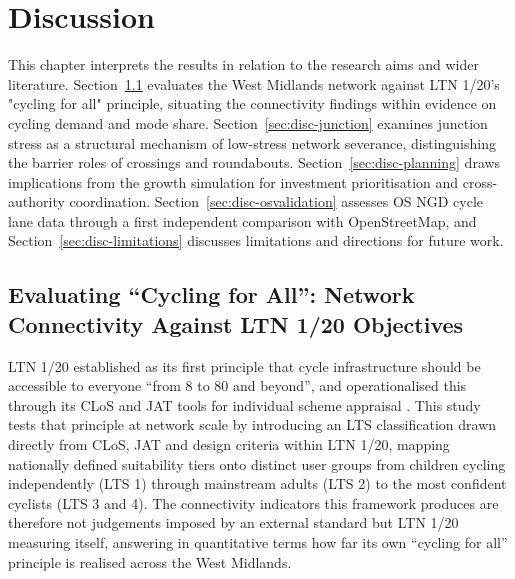 \chapter{Discussion}
\label{ch:discussion}

This chapter interprets the results in relation to the research aims and wider literature. Section~\ref{sec:disc-cyclingforall} evaluates the West Midlands network against LTN 1/20's "cycling for all" principle, situating the connectivity findings within evidence on cycling demand and mode share. Section~\ref{sec:disc-junction} examines junction stress as a structural mechanism of low-stress network severance, distinguishing the barrier roles of crossings and roundabouts. Section~\ref{sec:disc-planning} draws implications from the growth simulation for investment prioritisation and cross-authority coordination. Section~\ref{sec:disc-osvalidation} assesses OS NGD cycle lane data through a first independent comparison with OpenStreetMap, and Section~\ref{sec:disc-limitations} discusses limitations and directions for future work.

\section{Evaluating ``Cycling for All'': Network Connectivity Against LTN 1/20 Objectives}
\label{sec:disc-cyclingforall}

LTN 1/20 established as its first principle that cycle infrastructure should be accessible to everyone ``from 8 to 80 and beyond'', and operationalised this through its CLoS and JAT tools for individual scheme appraisal \parencite{departmentfortransport2020a}. This study tests that principle at network scale by introducing an LTS classification drawn directly from CLoS, JAT and design criteria within LTN 1/20, mapping nationally defined suitability tiers onto distinct user groups from children cycling independently (LTS 1) through mainstream adults (LTS 2) to the most confident cyclists (LTS 3 and 4). The connectivity indicators this framework produces are therefore not judgements imposed by an external standard but LTN 1/20 measuring itself, answering in quantitative terms how far its own ``cycling for all'' principle is realised across the West Midlands.

